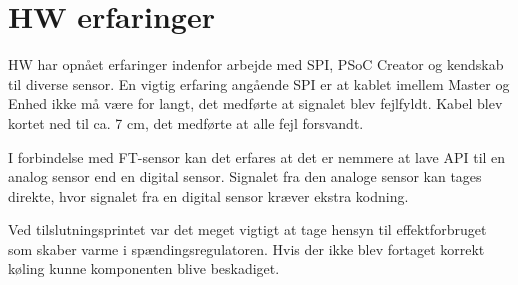 \section{HW erfaringer}

HW har opnået erfaringer indenfor arbejde med SPI, PSoC Creator og kendskab til diverse sensor. En vigtig erfaring angående SPI er at kablet imellem Master og Enhed ikke må være for langt, det medførte at signalet blev fejlfyldt. Kabel blev kortet ned til ca. 7 cm, det medførte at alle fejl forsvandt.

I forbindelse med FT-sensor kan det erfares at det er nemmere at lave API til en analog sensor end en digital sensor. Signalet fra den analoge sensor kan tages direkte, hvor signalet fra en digital sensor kræver ekstra kodning. 

Ved tilslutningsprintet var det meget vigtigt at tage hensyn til effektforbruget som skaber varme i spændingsregulatoren. Hvis der ikke blev fortaget korrekt køling kunne komponenten blive beskadiget.  
